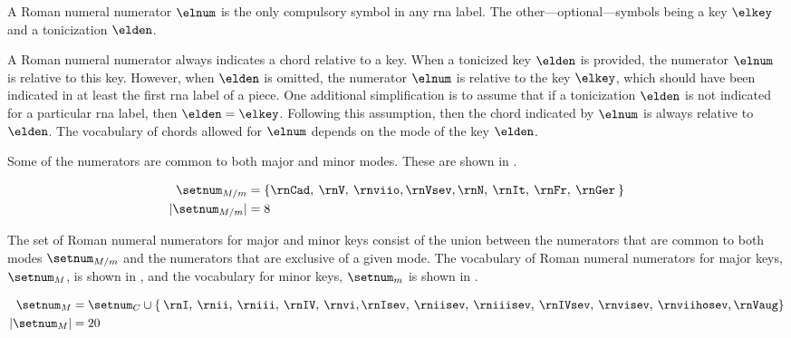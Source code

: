 
A Roman numeral numerator $\elnum$ is the only compulsory
symbol in any \gls{rna} label. The
other---optional---symbols being a key $\elkey$ and a
tonicization $\elden$.

A Roman numeral numerator always indicates a chord relative
to a key. When a tonicized key $\elden$ is provided, the
numerator $\elnum$ is relative to this key. However, when
$\elden$ is omitted, the numerator $\elnum$ is relative to
the key $\elkey$, which should have been indicated in at
least the first \gls{rna} label of a piece. One additional
simplification is to assume that if a tonicization $\elden$
is not indicated for a particular \gls{rna} label, then
$\elden = \elkey$. Following this assumption, then the chord
indicated by $\elnum$ is always relative to $\elden$. The
vocabulary of chords allowed for $\elnum$ depends on the
mode of the key $\elden$.

Some of the numerators are common to both major and minor
modes. These are shown in . 

\begin{equation}
    \label{eq:common_numerators}
    \begin{split}
    \setnum_{M/m} &= \{ \rnCad, \: \rnV, \: \rnviio,
    \rnVsev, \rnN, \: \rnIt, \: \rnFr, \: \rnGer \: \} \\
    | \setnum_{M/m} | &= 8
    \end{split}
\end{equation}

The set of Roman numeral numerators for major and minor keys
consist of the union between the numerators that are common
to both modes $\setnum_{M/m}$ and the numerators that are
exclusive of a given mode. The vocabulary of Roman numeral
numerators for major keys, $\setnum_{M}$, is shown in
, and the vocabulary for minor keys,
$\setnum_{m}$ is shown in .

\begin{equation}
    \label{eq:major_numerators}
    \begin{split}
    \setnum_{M} &= \setnum_{C} \cup \{ \: \rnI, \: \rnii, \: 
    \rniii, \: \rnIV, \: \rnvi, \rnIsev, \: \rniisev, \: 
    \rniiisev, \: \rnIVsev, \: \rnvisev, \: \rnviihosev, \rnVaug \} \\
    | \setnum_{M} | &= 20
    \end{split}
\end{equation}

